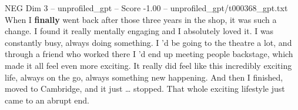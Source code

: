 \begin{textsample}{NEG Dim 3 – unprofiled\_gpt – Score -1.00 – unprofiled\_gpt/t000368\_gpt.txt}  \label{ex:f3_neg_018}
When I \textbf{finally} went back after those three years in the shop, it was such a change.
I found it really mentally engaging and I absolutely loved it.
I was constantly busy, always doing something.
I ’d be going to the theatre a lot, and through a friend who worked there I ’d end up meeting people backstage, which made it all feel even more exciting.
It really did feel like this incredibly exciting life, always on the go, always something new happening.
And then I finished, moved to Cambridge, and it just … stopped.
That whole exciting lifestyle just came to an abrupt end.

\end{textsample}
